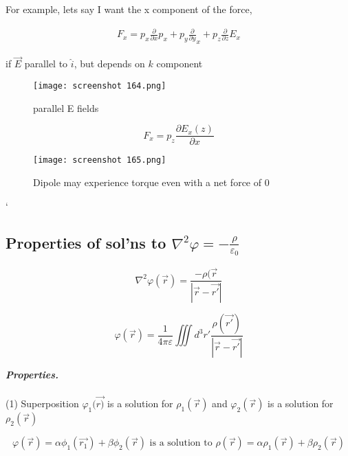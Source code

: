 \documentclass[svgnames]{article}   	%
\begin{document}
For example, lets say I want the x component of the force, 

\begin{align*}
  F_x = p_x\frac{\partial }{\partial x}p_x +p_y \frac{\partial }{\partial y}_x
+ p_z\frac{\partial }{\partial z}E_x 
\end{align*}

if $\vec{E} $ parallel to $\hat{i}$, but depends on $k$ component 

\begin{figure}[H]
  \centering
    \texttt{[image: screenshot 164.png]}
    \caption{parallel E fields}
\end{figure}


\[
F_x = p_z \frac{\partial E_x(z)}{\partial x} 
\]

\begin{figure}[H]
  \centering
    \texttt{[image: screenshot 165.png]}
    \caption{Dipole may experience torque even with a net force of 0}
\end{figure}



`
\subsection{Properties of sol'ns to $\nabla^2 \varphi = -\frac{\rho}{\varepsilon_0}$}


\begin{tcolorbox}[colback = red!5!white, colframe = red!50!black, title
  = Poisson's Equation]
  
  \[
    \nabla^2 \varphi(\vec{r}) = \frac{-\rho(\vec{r} }{|\vec{r} - \vec{r'}| }
  \]
\end{tcolorbox}

\begin{tcolorbox}[colback = blue!5!white, colframe = blue!50!black, title
  = Solution]
  \[
  \varphi(\vec{r}) = \frac{1}{4\pi\varepsilon}\iiint d^3 r'
  \frac{\rho(\vec{r'})}{|\vec{r} - \vec{r'}|} 
\]
\end{tcolorbox}

\textit{ \textbf{Properties.}} \mbox{}\\\\

(1) Superposition \hspace{10px} $\varphi_1(\vec{r)}$ is a solution for
$\rho_1(\vec{r})$ and $\varphi_2(\vec{r})$ is a solution for $\rho_2(\vec{r})$ 

\[
\varphi(\vec{r}) = \alpha\phi_1(\vec{r_1}) + \beta \phi_2(\vec{r}) \text{ is
a solution to } \rho(\vec{r}) = \alpha \rho_1(\vec{r}) + \beta \rho_2(\vec{r})  
\] \vspace{5px}
\end{document}
